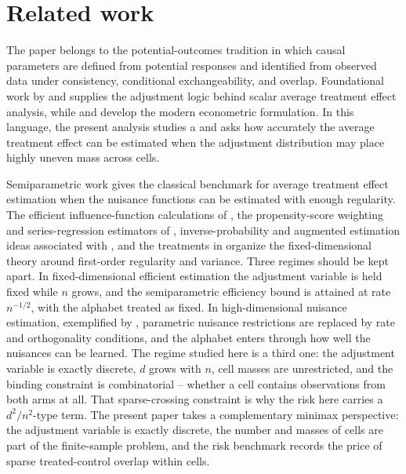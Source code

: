 \section{Related work}

The paper belongs to the potential-outcomes tradition in which causal parameters are defined from potential responses and identified from observed data under consistency, conditional exchangeability, and overlap. Foundational work by \citet{Rubin1974,Rubin1979} and \citet{RosenbaumRubin1983} supplies the adjustment logic behind scalar average treatment effect analysis, while \citet{Imbens2009} and \citet{ImbensRubin2015} develop the modern econometric formulation. In this language, the present analysis studies a  and asks how accurately the average treatment effect can be estimated when the adjustment distribution may place highly uneven mass across cells.

Semiparametric work gives the classical benchmark for average treatment effect estimation when the nuisance functions can be estimated with enough regularity. The efficient influence-function calculations of \citet{Hahn1998}, the propensity-score weighting and series-regression estimators of \citet{Hirano2003}, inverse-probability and augmented estimation ideas associated with \citet{Robins1994}, and the treatments in \citet{VanderLaan2003,Tsiatis2006,VanderVaart1998} organize the fixed-dimensional theory around first-order regularity and variance. Three regimes should be kept apart. In fixed-dimensional efficient estimation the adjustment variable is held fixed while \(n\) grows, and the semiparametric efficiency bound is attained at rate \(n^{-1/2}\), with the alphabet treated as fixed. In high-dimensional nuisance estimation, exemplified by \citet{Belloni2017,Chernozhukov2018,Kennedy2022,Kennedy2023}, parametric nuisance restrictions are replaced by rate and orthogonality conditions, and the alphabet enters through how well the nuisances can be learned. The regime studied here is a third one: the adjustment variable is exactly discrete, \(d\) grows with \(n\), cell masses are unrestricted, and the binding constraint is combinatorial -- whether a cell contains observations from both arms at all. That sparse-crossing constraint is why the risk here carries a \(d^2/n^2\)-type term. The present paper takes a complementary minimax perspective: the adjustment variable is exactly discrete, the number and masses of cells are part of the finite-sample problem, and the risk benchmark records the price of sparse treated-control overlap within cells.

